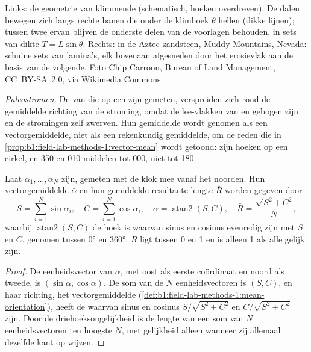 \begin{omfigure}
{\small Links: de geometrie van klimmende  (schematisch, hoeken overdreven). De dalen bewegen zich langs rechte banen die onder de klimhoek $\theta$ hellen (dikke lijnen); tussen twee ervan blijven de onderste delen van de voorlagen behouden, in sets van dikte $T = L\sin\theta$. Rechts:  in de Aztec-zandsteen, Muddy Mountains, Nevada: schuine sets van lamina's, elk bovenaan afgesneden door het erosievlak aan de basis van de volgende. Foto Chip Carroon, Bureau of Land Management, CC~BY-SA~2.0, via Wikimedia Commons.}
\label{fig:b1:clastic-sediments:climb}
\end{omfigure}

\emph{Paleostromen.} De  van  die op een  zijn gemeten, verspreiden zich rond de gemiddelde richting van de stroming, omdat de lee-vlakken van  en  gebogen zijn en de stromingen zelf zwerven. Hun gemiddelde wordt genomen als een vectorgemiddelde, niet als een rekenkundig gemiddelde, om de reden die in \cref{prop:b1:field-lab-methods-1:vector-mean} wordt getoond:  zijn hoeken op een cirkel, en 350 en 010 middelen tot 000, niet tot 180.

\begin{proposition}\label{prop:b1:clastic-sediments:azimuths}
Laat $\alpha_1, \ldots, \alpha_N$  zijn, gemeten met de klok mee vanaf het noorden. Hun vectorgemiddelde $\bar\alpha$ en hun gemiddelde resultante-lengte $\bar R$ worden gegeven door
\[
  S = \sum_{i=1}^N \sin\alpha_i, \quad C = \sum_{i=1}^N \cos\alpha_i, \quad
  \bar\alpha = \operatorname{atan2}(S, C), \quad \bar R = \frac{\sqrt{S^2 + C^2}}{N},
\]
waarbij $\operatorname{atan2}(S, C)$ de hoek is waarvan sinus en cosinus evenredig zijn met $S$ en $C$, genomen tussen \ang{0} en \ang{360}. $\bar R$ ligt tussen 0 en 1 en is alleen 1 als alle  gelijk zijn.
\end{proposition}

\begin{proof}
De eenheidsvector van  $\alpha$, met oost als eerste coördinaat en noord als tweede, is $(\sin\alpha, \cos\alpha)$. De som van de $N$ eenheidsvectoren is $(S, C)$, en haar richting, het vectorgemiddelde (\cref{def:b1:field-lab-methods-1:mean-orientation}), heeft de  waarvan sinus en cosinus $S/\sqrt{S^2+C^2}$ en $C/\sqrt{S^2+C^2}$ zijn. Door de driehoeksongelijkheid is de lengte van een som van $N$ eenheidsvectoren ten hoogste $N$, met gelijkheid alleen wanneer zij allemaal dezelfde kant op wijzen.
\end{proof}

